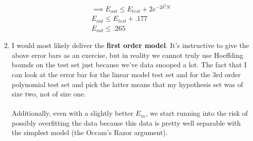 \documentclass[12pt]{article}
\begin{document}
\begin{enumerate}[label=(\alph*)]
\begin{gather*}
	 	\\ \implies E_{out} \le E_{test} + 2e^{-2\delta^2N}
	 	\\ E_{out} \le E_{test} + .177
	 	\\ E_{out} \le \boldsymbol{.265}
 	\end{gather*}
 	\item I would most likely deliver the \textbf{first order model}. It's instructive to give the above error bars as an exercise, but in reality we cannot truly use Hoeffding bounds on the test set just because we've data snooped a lot. The fact that I can look at the error bar for the linear model test set and for the 3rd order polynomial test set and pick the latter means that my hypothesis set was of size two, not of size one.
 	\\ \\ Additionally, even with a slightly better $E_{in}$, we start running into the risk of possibly overfitting the data because this data is pretty well separable with the simplest model (the Occam's Razor argument).
\end{enumerate}
\end{document}
